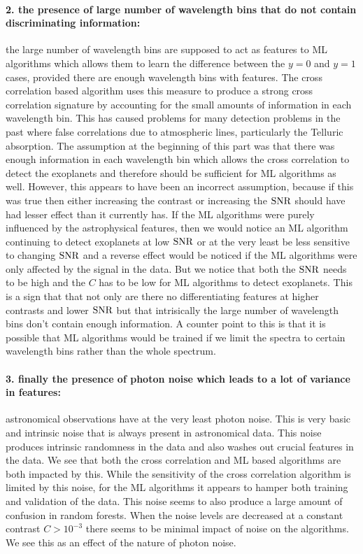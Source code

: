 \paragraph{2. the presence of large number of wavelength bins that do not contain discriminating information:\\}
the large number of wavelength bins are supposed to act as features to ML algorithms which allows them to learn the difference between the $y=0$ and $y=1$ cases, provided there are enough wavelength bins with features.
The cross correlation based algorithm uses this measure to produce a strong cross correlation signature by accounting for the small amounts of information in each wavelength bin. 
This has caused problems for many detection problems in the past where false correlations due to atmospheric lines, particularly the Telluric absorption.
The assumption at the beginning of this part was that there was enough information in each wavelength bin which allows the cross correlation to detect the exoplanets and therefore should be sufficient for ML algorithms as well.
However, this appears to have been an incorrect assumption, because if this was true then either increasing the contrast or increasing the $\rm{SNR}$ should have had lesser effect than it currently has.
If the ML algorithms were purely influenced by the astrophysical features, then we would notice an ML algorithm continuing to detect exoplanets at low $\rm{SNR}$ or at the very least be less sensitive to changing $\rm{SNR}$ and a reverse effect would be noticed if the ML algorithms were only affected by the signal in the data. 
But we notice that both the $\rm{SNR}$ needs to be high and the $C$ has to be low for ML algorithms to detect exoplanets.
This is a sign that that not only are there no differentiating features at higher contrasts and lower $\rm{SNR}$ but that intrisically the large number of wavelength bins don't contain enough information. 
A counter point to this is that it is possible that ML algorithms would be trained if we limit the spectra to certain wavelength bins rather than the whole spectrum.
\paragraph{3. finally the presence of photon noise which leads to a lot of variance in features:\\}
astronomical observations have at the very least photon noise. 
This is very basic and intrinsic noise that is always present in astronomical data.
This noise produces intrinsic randomness in the data and also washes out crucial features in the data. 
We see that both the cross correlation and ML based algorithms are both impacted by this.
While the sensitivity of the cross correlation algorithm is limited by this noise, for the ML algorithms it appears to hamper both training and validation of the data.
This noise seems to also produce a large amount of confusion in random forests.
When the noise levels are decreased at a constant contrast $C>10^{-3}$ there seems to be minimal impact of noise on the algorithms. 
We see this as an effect of the nature of photon noise. 


